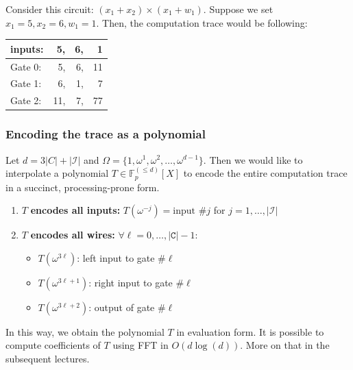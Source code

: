 \documentclass[../lecture-notes.tex]{subfiles}
\begin{document}
\begin{example}
Consider this circuit: \((x_1 + x_2)\times(x_1 + w_1)\). Suppose we set \(x_1 = 5, x_2 = 6, w_1 = 1\). Then, the computation trace would be following:

\begin{center}
\begin{tabular}{l rrr}
  inputs: & 5, & 6, & 1 \\ \hline
  Gate 0: & 5, & 6, & 11 \\
  Gate 1: & 6, & 1, & 7 \\
  Gate 2: & 11, & 7, & 77 \\ 
\end{tabular}
\end{center}
\end{example}

\subsubsection{Encoding the trace as a polynomial}

Let \(d = 3|C| + |\mathcal{I}|\) and \(\Omega = \{1, \omega^1, \omega^2, \dots, \omega^{d-1}\}\). Then we would like to interpolate a polynomial \(T \in \mathbb{F}_p^{(\leq d)}[X]\) to encode the entire computation trace in a succinct, processing-prone form.

\begin{enumerate}
    \item \(T\) \textbf{encodes all inputs:} \( T(\omega^{-j}) = \text{input \#} j\) for \(j = 1, \dots, |\mathcal{I}| \)
    \item \(T\) \textbf{encodes all wires:} \( \forall \ell = 0, \dots, |\texttt{C}| - 1: \)
    \begin{itemize}
        \item \( T(\omega^{3\ell}) \): left input to gate \#\( \ell \)
        \item \( T(\omega^{3\ell+1}) \): right input to gate \#\( \ell \)
        \item \( T(\omega^{3\ell+2}) \): output of gate \#\( \ell \)
    \end{itemize}
\end{enumerate}

\begin{remark}
In this way, we obtain the polynomial \(T\) in evaluation form. It is possible to compute coefficients of \(T\) using FFT in \(O(d\log(d))\). More on that in the subsequent lectures.
\end{remark}
\end{document}
